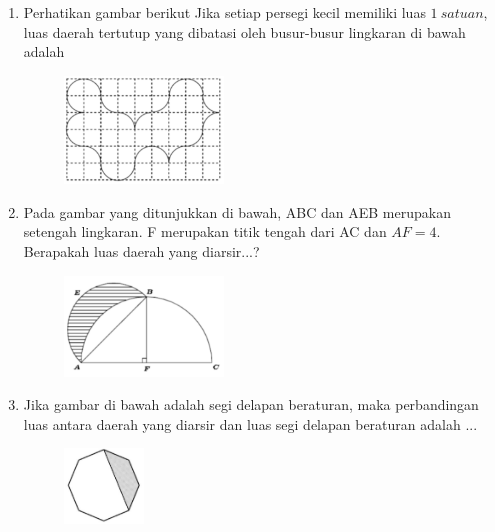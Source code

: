 \documentclass[11pt]{scrartcl}
\begin{document}
\begin{enumerate}
\vspace{6cm}\item Perhatikan gambar berikut Jika setiap persegi kecil memiliki luas $ 1\ satuan $, luas daerah tertutup yang dibatasi oleh busur-busur lingkaran di bawah adalah
\begin{figure}[h]
\centering
\includegraphics[width=0.4\textwidth]{StarGen/0Figure/curly-path.png}
\end{figure}

\vspace{6cm}\item Pada gambar yang ditunjukkan di bawah, ABC dan AEB merupakan setengah lingkaran. F merupakan titik tengah dari AC dan $ AF = 4 $. Berapakah luas daerah yang diarsir...?
\begin{figure}[h]
\centering
\includegraphics[width=0.4\textwidth]{StarGen/0Figure/2-setengah-lingkaran-sabit.png}
\end{figure}

\vspace{6cm}\item Jika gambar di bawah adalah segi delapan beraturan, maka perbandingan luas antara daerah yang diarsir dan luas segi delapan beraturan adalah ...
\begin{figure}[h]
\centering
\includegraphics[width=0.2\textwidth]{StarGen/0Figure/luas-diarsir-segidelapan.png}
\end{figure}


\end{enumerate}
\end{document}
